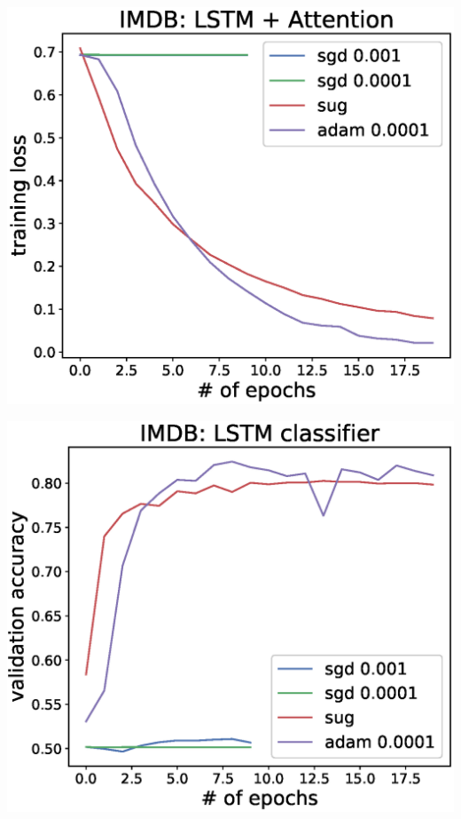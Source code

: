 \documentclass[a0]{a0poster}
\begin{document}
\begin{textblock}{7.0}
\begin{minipage}{0.35\textwidth}
	\begin{center}
		\includegraphics[width=1\textwidth]{figures/imdb_attn_ep.eps}
	\end{center}
\end{minipage}
\begin{minipage}{0.35\textwidth}
	\begin{center}
		\includegraphics[width=1\textwidth]{figures/imdb_attn_val_acc.eps}

\end{center}
\end{minipage}
\end{textblock}
\end{document}
